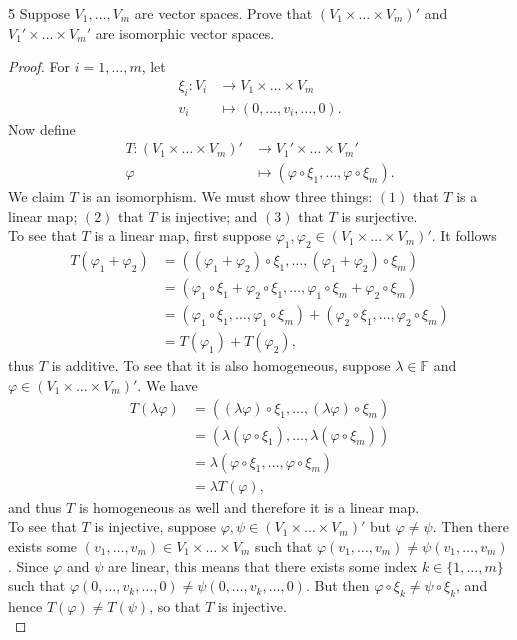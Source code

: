 \documentclass{extarticle}
\newenvironment{problem}[1]{\begin{prob*}{#1}{}}{\end{prob*}}
\newcommand{\F}{\mathbb{F}}
\begin{document}
\begin{problem}{5}
Suppose $V_1,\dots,V_m$ are vector spaces.  Prove that $(V_1\times\dots\times V_m)'$ and $V_1'\times\dots\times V_m'$ are isomorphic vector spaces.
\end{problem}
\begin{proof}
For $i = 1,\dots, m$, let
\begin{align*}
\xi_i:V_i&\to V_1\times\dots \times V_m\\
v_i &\mapsto (0, \dots, v_i, \dots, 0).
\end{align*}
Now define
\begin{align*}
T: (V_1\times\dots\times V_m)' &\to V_1'\times\dots\times V_m'\\
\varphi &\mapsto \left(\varphi\circ\xi_1, \dots, \varphi\circ\xi_m\right).
\end{align*}
We claim $T$ is an isomorphism.  We must show three things: $(1)$ that $T$ is a linear map; $(2)$ that $T$ is injective; and $(3)$ that $T$ is surjective.\\
\indent To see that $T$ is a linear map, first suppose $\varphi_1,\varphi_2\in (V_1\times\dots\times V_m)'$.  It follows
\begin{align*}
T(\varphi_1 + \varphi_2) &=  \left((\varphi_1 + \varphi_2)\circ\xi_1, \dots, (\varphi_1+\varphi_2)\circ\xi_m\right)\\
&= \left(\varphi_1\circ\xi_1 + \varphi_2\circ\xi_1, \dots, \varphi_1\circ\xi_m + \varphi_2\circ\xi_m\right)\\
&=(\varphi_1\circ\xi_1,\dots,\varphi_1\circ\xi_m) + (\varphi_2\circ\xi_1,\dots,\varphi_2\circ\xi_m)\\
&=T(\varphi_1) + T(\varphi_2),
\end{align*}
thus $T$ is additive.  To see that it is also homogeneous, suppose $\lambda\in\F$ and $\varphi\in(V_1\times\dots\times V_m)'$.  We have
\begin{align*}
T(\lambda\varphi) &= \left((\lambda\varphi)\circ\xi_1, \dots, (\lambda\varphi)\circ\xi_m\right)\\
&= \left(\lambda(\varphi\circ\xi_1), \dots, \lambda(\varphi\circ\xi_m)\right)\\
&= \lambda\left(\varphi\circ\xi_1, \dots, \varphi\circ\xi_m\right)\\
&= \lambda T(\varphi),
\end{align*}
and thus $T$ is homogeneous as well and therefore it is a linear map.\\
\indent To see that $T$ is injective, suppose $\varphi,\psi\in (V_1\times\dots\times V_m)'$ but $\varphi \neq \psi$.  Then there exists some $(v_1,\dots,v_m)\in V_1\times\dots\times V_m$ such that $\varphi(v_1,\dots,v_m)\neq \psi(v_1,\dots,v_m)$.  Since $\varphi$ and $\psi$ are linear, this means that there exists some index $k\in\{1,\dots,m\}$ such that $\varphi(0,\dots,v_k,\dots, 0)\neq\psi(0,\dots,v_k,\dots,0)$.  But then $\varphi\circ\xi_k\neq \psi\circ\xi_k$, and hence $T(\varphi)\neq T(\psi)$, so that $T$ is injective.\\

\end{proof}
\end{document}
